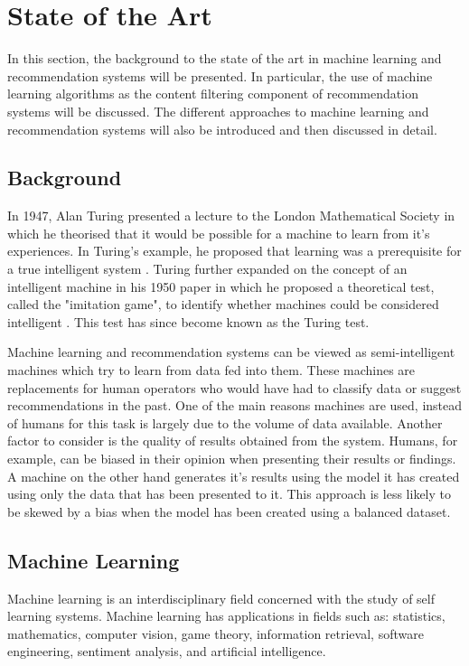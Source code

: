 \chapter{State of the Art}

In this section, the background to the state of the art in machine learning and recommendation systems will be presented.
In particular, the use of machine learning algorithms as the content filtering component of recommendation systems will be discussed.
The different approaches to machine learning and recommendation systems will also be introduced and then discussed in detail.

\section{Background}
In 1947, Alan Turing presented a lecture to the London Mathematical Society in which he theorised that it would be possible for a machine to learn from it's experiences.
In Turing's example, he proposed that learning was a prerequisite for a true intelligent system \cite{Turing1946}.
Turing further expanded on the concept of an intelligent machine in his 1950 paper in which he proposed a theoretical test, called the "imitation game", to identify whether machines could be considered intelligent \cite{Turing1950}.
This test has since become known as the Turing test.

Machine learning and recommendation systems can be viewed as semi-intelligent machines which try to learn from data fed into them.
These machines are replacements for human operators who would have had to classify data or suggest recommendations in the past.
One of the main reasons machines are used, instead of humans for this task is largely due to the volume of data available.
Another factor to consider is the quality of results obtained from the system.
Humans, for example, can be biased in their opinion when presenting their results or findings.
A machine on the other hand generates it's results using the model it has created using only the data that has been presented to it.
This approach is less likely to be skewed by a bias when the model has been created using a balanced dataset\cite{FProvost2000}.

\section{Machine Learning}
Machine learning is an interdisciplinary field concerned with the study of self learning systems.
Machine learning has applications in fields such as: statistics, mathematics, computer vision, game theory, information retrieval, software engineering, sentiment analysis, and artificial intelligence.

